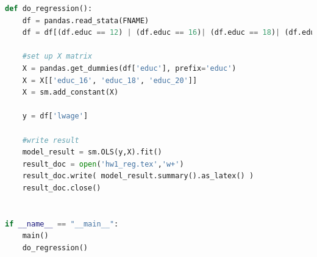 \documentclass{article}
\begin{document}
\begin{enumerate}[label=\alph*)]
\begin{lstlisting}[language=Python]
def do_regression():
	df = pandas.read_stata(FNAME)
	df = df[(df.educ == 12) | (df.educ == 16)| (df.educ == 18)| (df.educ == 20)]
	
	#set up X matrix
	X = pandas.get_dummies(df['educ'], prefix='educ')
	X = X[['educ_16', 'educ_18', 'educ_20']]
	X = sm.add_constant(X)
	
	y = df['lwage']
	
	#write result
	model_result = sm.OLS(y,X).fit()
	result_doc = open('hw1_reg.tex','w+')
	result_doc.write( model_result.summary().as_latex() )
	result_doc.close()


if __name__ == "__main__":
	main()
	do_regression()

\end{lstlisting}

\end{enumerate}
\end{document}
